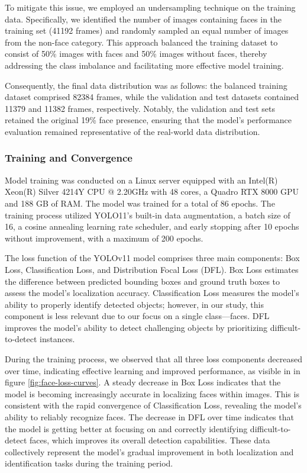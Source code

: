 \documentclass[
  man,floatsintext]{apa6}
\begin{document}
To mitigate this issue, we employed an undersampling technique on the training data. Specifically, we identified the number of images containing faces in the training set (41192 frames) and randomly sampled an equal number of images from the non-face category. This approach balanced the training dataset to consist of 50\% images with faces and 50\% images without faces, thereby addressing the class imbalance and facilitating more effective model training.

Consequently, the final data distribution was as follows: the balanced training dataset comprised 82384 frames, while the validation and test datasets contained 11379 and 11382 frames, respectively. Notably, the validation and test sets retained the original 19\% face presence, ensuring that the model's performance evaluation remained representative of the real-world data distribution.

\subsubsection{Training and Convergence}\label{training-and-convergence}

Model training was conducted on a Linux server equipped with an Intel(R) Xeon(R) Silver 4214Y CPU @ 2.20GHz with 48 cores, a Quadro RTX 8000 GPU and 188 GB of RAM. The model was trained for a total of 86 epochs. The training process utilized YOLO11's built-in data augmentation, a batch size of 16, a cosine annealing learning rate scheduler, and early stopping after 10 epochs without improvement, with a maximum of 200 epochs.

The loss function of the YOLOv11 model comprises three main components: Box Loss, Classification Loss, and Distribution Focal Loss (DFL). Box Loss estimates the difference between predicted bounding boxes and ground truth boxes to assess the model's localization accuracy. Classification Loss measures the model's ability to properly identify detected objects; however, in our study, this component is less relevant due to our focus on a single class---faces. DFL improves the model's ability to detect challenging objects by prioritizing difficult-to-detect instances.

During the training process, we observed that all three loss components decreased over time, indicating effective learning and improved performance, as visible in in figure \ref{fig:face-loss-curves}. A steady decrease in Box Loss indicates that the model is becoming increasingly accurate in localizing faces within images. This is consistent with the rapid convergence of Classification Loss, revealing the model's ability to reliably recognize faces. The decrease in DFL over time indicates that the model is getting better at focusing on and correctly identifying difficult-to-detect faces, which improves its overall detection capabilities. These data collectively represent the model's gradual improvement in both localization and identification tasks during the training period.
\end{document}
